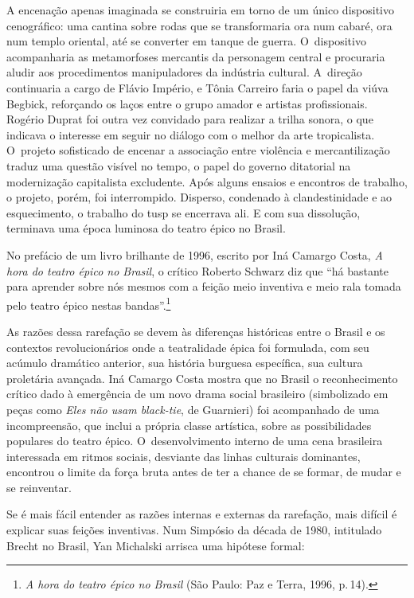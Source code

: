 A encenação apenas imaginada se construiria em torno de um único
dispositivo cenográfico: uma cantina sobre rodas que se transformaria
ora num cabaré, ora num templo oriental, até se converter em tanque de
guerra. O~dispositivo acompanharia as metamorfoses mercantis da
personagem central e procuraria aludir aos procedimentos manipuladores
da indústria cultural. A~direção continuaria a cargo de Flávio Império,
e Tônia Carreiro faria o papel da viúva Begbick, reforçando os laços
entre o grupo amador e artistas profissionais. Rogério Duprat foi outra
vez convidado para realizar a trilha sonora, o que indicava o interesse
em seguir no diálogo com o melhor da arte tropicalista. O~projeto
sofisticado de encenar a associação entre violência e mercantilização
traduz uma questão visível no tempo, o papel do governo ditatorial na
modernização capitalista excludente. Após alguns ensaios e encontros de
trabalho, o projeto, porém, foi interrompido. Disperso, condenado à
clandestinidade e ao esquecimento, o trabalho do {\sc tusp} se encerrava ali.
E com sua dissolução, terminava uma época luminosa do teatro épico no
Brasil.

No prefácio de um livro brilhante de 1996, escrito por Iná Camargo
Costa, {\it A hora do teatro épico no Brasil}, o crítico Roberto Schwarz
diz que “há bastante para aprender sobre nós mesmos com a feição meio
inventiva e meio rala tomada pelo teatro épico nestas
bandas”.\footnote{{\it A hora do teatro épico no Brasil} (São Paulo: Paz
  e Terra, 1996, p.\,14).}

As razões dessa rarefação se devem às diferenças históricas entre o
Brasil e os contextos revolucionários onde a teatralidade épica foi
formulada, com seu acúmulo dramático anterior, sua história burguesa
específica, sua cultura proletária avançada. Iná Camargo Costa mostra
que no Brasil o reconhecimento crítico dado à emergência de um novo
drama social brasileiro (simbolizado em peças como {\it Eles não usam
black-tie}, de Guarnieri) foi acompanhado de uma incompreensão, que
inclui a própria classe artística, sobre as possibilidades populares do
teatro épico. O~desenvolvimento interno de uma cena brasileira
interessada em ritmos sociais, desviante das linhas culturais
dominantes, encontrou o limite da força bruta antes de ter a chance de
se formar, de mudar e se reinventar.

Se é mais fácil entender as razões internas e externas da rarefação,
mais difícil é explicar suas feições inventivas. Num Simpósio da década
de 1980, intitulado Brecht no Brasil, Yan Michalski arrisca uma hipótese
formal:

